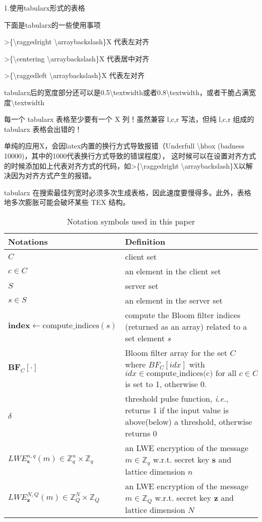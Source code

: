   1.使用tabularx形式的表格

  下面是tabularx的一些使用事项

  >\{\textbackslash raggedright \textbackslash arraybackslash\}X 代表左对齐

  >\{\textbackslash centering \textbackslash arraybackslash\}X 代表居中对齐

  >\{\textbackslash raggedleft \textbackslash arraybackslash\}X 代表左对齐

  tabularx后的宽度部分还可以是0.5\textbackslash textwidth或者0.8\textbackslash  textwidth，或者干脆占满宽度\textbackslash textwidth

  每一个 tabularx 表格至少要有一个 X 列！虽然兼容 l,c,r 写法，但纯 l,c,r 组成的 tabularx 表格会出错的！

  单纯的应用X，会因latex内置的换行方式导致报错（Underfull \textbackslash hbox (badness 10000)，其中的1000代表换行方式导致的错误程度），
  这时候可以在设置对齐方式的时候添加如上代表对齐方式的代码，如>\{\textbackslash raggedright \textbackslash arraybackslash\}X以解决因为对齐方式产生的报错。

  tabularx 在搜索最佳列宽时必须多次生成表格，因此速度要慢得多。此外，表格地多次膨胀可能会破坏某些 TEX 结构。

  
\begin{table}[htbp]
  \centering
  \caption{Notation symbols used in this paper}
  \begin{tabularx}{\textwidth}{ >{\raggedright\arraybackslash}p{5cm} L }  %
  \toprule
    Notations  & Definition \\
  \midrule
    $C$ & client set \\
    $c\in C$ & an element in the client set \\
    $S$ & server set \\
    $s\in S$ & an element in the server set \\
    $\mathbf{index}\gets \text{compute\_indices}(s)$ & compute the Bloom filter indices (returned as an array) related to a set element $s$\\
    $\mathbf{BF}_{C}[\cdot]$ & Bloom filter array for the set $C$ where $BF_{C}[idx]$ with $idx\in \text{compute\_indices(c) for all } c\in C$ is set to 1, otherwise 0.\\
    $\delta$   & threshold pulse function, \textit{i.e.}, returns 1 if the input value is above(below) a threshold, otherwise returns 0\\
    $LWE_{\mathbf{s}}^{n,q}(m) \in \mathbb{Z}_q^n\times \mathbb{Z}_q $ & an LWE encryption of the message $m\in \mathbb{Z}_q$ w.r.t. \newline secret key $\mathbf{s}$ and lattice dimension $n$\\
    $LWE_{\mathbf{z}}^{N,Q}(m) \in \mathbb{Z}_Q^N\times \mathbb{Z}_Q $ & an LWE encryption of the message $m\in \mathbb{Z}_Q$ w.r.t. \newline secret key $\mathbf{z}$ and lattice dimension $N$\\
  \bottomrule
  \end{tabularx}
  \end{table}


